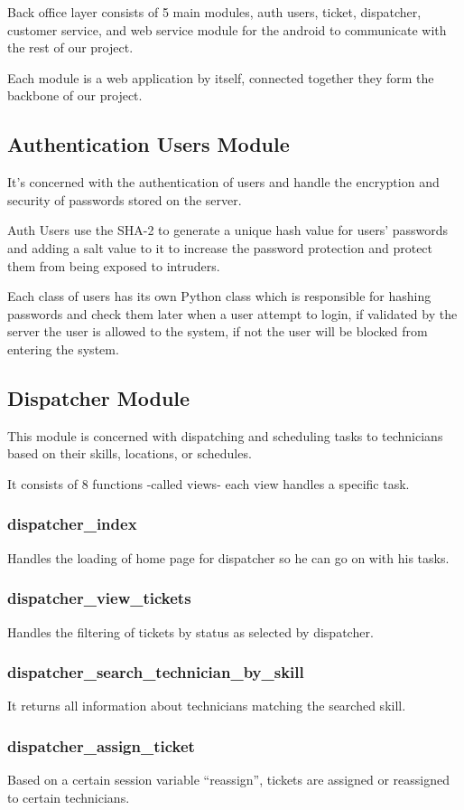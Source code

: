 Back office layer consists of 5 main modules, auth users, ticket, dispatcher, customer service, and web service module for the android to communicate with the rest of our project.

Each module is a web application by itself, connected together they form the backbone of our project.

\subsection{Authentication Users Module}
	It's concerned with the authentication of users and handle the encryption and security of passwords stored on the server.
	
	Auth Users use the SHA-2 to generate a unique hash value for users' passwords and adding a salt value to it to increase the password protection and protect them from being exposed to intruders.
	
	Each class of users has its own Python class which is responsible for hashing passwords and check them later when a user attempt to login, if validated by the server the user is allowed to the system, if not the user will be blocked from entering the system.
	
\subsection{Dispatcher Module}
	This module is concerned with dispatching and scheduling tasks to technicians based on their skills, locations, or schedules.
	
	It consists of 8 functions -called views- each view handles a specific task.
	
	\subsubsection{dispatcher\_index}
		Handles the loading of home page for dispatcher so he can go on with his tasks.
	\subsubsection{dispatcher\_view\_tickets}
		Handles the filtering of tickets by status as selected by dispatcher.
	\subsubsection{dispatcher\_search\_technician\_by\_skill}
		It returns all information about technicians matching the searched skill.
	\subsubsection{dispatcher\_assign\_ticket}
		Based on a certain session variable ``reassign'', tickets are assigned or reassigned to certain technicians.
